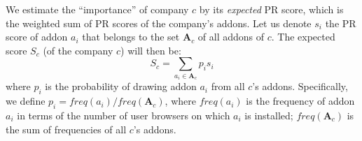 \documentclass[11pt,oneside]{book}
\begin{document}
We estimate the ``importance'' of company $c$ by its \emph{expected} PR score, which is the weighted sum of PR scores of the company's addons. Let us denote $s_i$ the PR score of addon $a_i$ that belongs to the set $\mathbf{A}_c$ of all addons of $c$. The expected score $S_c$ (of the company $c$) will then be:
$$
S_c = \sum_{a_i \in \mathbf{A}_c} p_i s_i
$$
where $p_i$ is the probability of drawing addon $a_i$ from all $c$'s addons. Specifically, we define $p_i = freq(a_i) / freq(\mathbf{A}_c)$, where $freq(a_i)$ is the frequency of addon $a_i$ in terms of the number of user browsers on which $a_i$ is installed; $freq(\mathbf{A}_c)$ is the sum of frequencies of all $c$'s addons.



\end{document}
